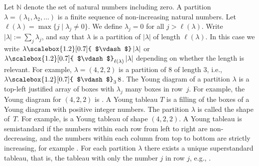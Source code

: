 Let $\mathbb{N}$ denote the set of natural numbers including zero.
A partition $\lambda=(\lambda_{1},\lambda_{2},\ldots)$ is a finite sequence of non-increasing natural numbers.
Let $\ell(\lambda)=\max\{j\mid\lambda_{j}\neq 0\}$. We define $\lambda_{j}=0$ for all $j>\ell(\lambda)$.
Write $|\lambda|:=\sum_{j}\lambda_{j}$, and say that $\lambda$ is a partition of $|\lambda|$ of length $\ell(\lambda)$. In this case we write $\lambda\mathchoice{\scalebox{1.2}[0.7]{ $\vdash$}\,}{\scalebox{1.2}[0.7]{ $\vdash$}\,}{\scalebox{0.7}{\scalebox{1.2}[0.7]{$\vdash$}}\,}{\scalebox{0.5}{\scalebox{1.2}[0.7]{$\vdash$}}\,}|\lambda|$ or $\lambda\mathchoice{\scalebox{1.2}[0.7]{ $\vdash$}_{\ell(\lambda)}\,}{\scalebox{1.2}[0.7]{ $\vdash$}_{\ell(\lambda)}\,}{\scalebox{0.7}{\scalebox{1.2}[0.7]{$\vdash$}}_{\ell(\lambda)}\,}{\scalebox{0.5}{\scalebox{1.2}[0.7]{$\vdash$}}_{\ell(\lambda)}\,}|\lambda|$ depending on whether the length is relevant. For example, $\lambda=(4,2,2)$ is a partition of $8$ of length $3$, i.e., $\lambda\mathchoice{\scalebox{1.2}[0.7]{ $\vdash$}_{3}\,}{\scalebox{1.2}[0.7]{ $\vdash$}_{3}\,}{\scalebox{0.7}{\scalebox{1.2}[0.7]{$\vdash$}}_{3}\,}{\scalebox{0.5}{\scalebox{1.2}[0.7]{$\vdash$}}_{3}\,}8$.
The Young diagram of a partition $\lambda$ is a top-left justified array of boxes with $\lambda_{j}$ many boxes in row $j$. For example, the Young diagram for $(4,2,2)$ is 
. A Young tableau $T$ is a filling of the boxes of a Young diagram with positive integer numbers. The partition $\lambda$ is called the shape of $T$. For example, 
is a Young tableau of shape $(4,2,2)$. A Young tableau is semistandard if the numbers within each row from left to right are non-decreasing, and the numbers within each column from top to bottom are strictly increasing, for example 
.
For each partition $\lambda$ there exists a unique superstandard tableau, that is, the tableau with only the number $j$ in row $j$, e.g., 
.





